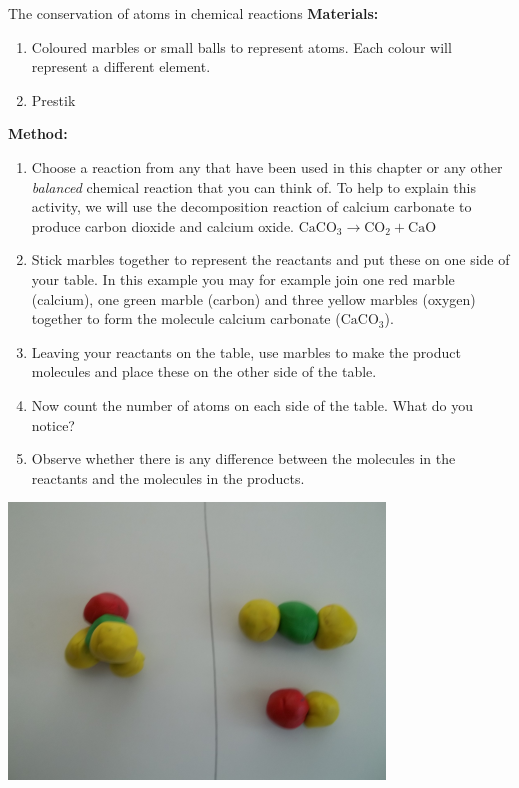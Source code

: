             \begin{activity}{The conservation of atoms in chemical reactions }
            \nopagebreak
            \label{m38711*id64844}\noindent{}\textbf{Materials:}
      \label{m38711*id64853}\begin{enumerate}[noitemsep, label=\textbf{\arabic*}. ] 
            \label{m38711*uid33}\item Coloured marbles or small balls to represent atoms. Each colour will represent a different element.
\label{m38711*uid34}\item Prestik
\end{enumerate}
        \par 

      \label{m38711*id64882}\noindent{}\textbf{Method:}\\
\begin{minipage}{.6\textwidth}
      \label{m38711*id64889}\begin{enumerate}[noitemsep, label=\textbf{\arabic*}. ] 
            \label{m38711*uid35}\item Choose a reaction from any that have been used in this chapter or any other \textsl{balanced} chemical reaction that you can think of. To help to explain this activity, we will use the decomposition reaction of calcium carbonate to produce carbon dioxide and calcium oxide.
${\mathrm{CaCO}}_{3}\to {\mathrm{CO}}_{2}+\mathrm{CaO}$
\label{m38711*uid36}\item Stick marbles together to represent the reactants and put these on one side of your table. In this example you may for example join one red marble (calcium), one green marble (carbon) and three yellow marbles (oxygen) together to form the molecule calcium carbonate (${\mathrm{CaCO}}_{3}$).
\label{m38711*uid37}\item Leaving your reactants on the table, use marbles to make the product molecules and place these on the other side of the table.
\label{m38711*uid38}\item Now count the number of atoms on each side of the table. What do you notice?
\label{m38711*uid39}\item Observe whether there is any difference between the molecules in the reactants and the molecules in the products.
\end{enumerate}
\end{minipage}
\begin{minipage}{.4\textwidth}
 \begin{center}
 \includegraphics[width=.6\textwidth]{photos/balancing3.png}\par

\end{center}
\end{minipage}
\end{activity}
